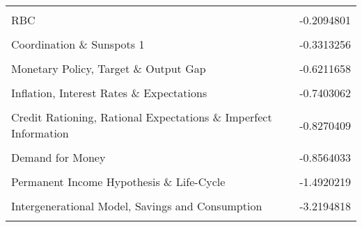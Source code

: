 \documentclass[]{elsarticle} %
\begin{document}
\begin{table}[!h]
\begin{tabular}[t]{lr}
\cellcolor{gray!6}{Endogenous Growth} & \cellcolor{gray!6}{-0.1105033}\\
RBC & -0.2094801\\
\cellcolor{gray!6}{Monetary Policy, Financial Transmission \& Cycles 1} & \cellcolor{gray!6}{-0.2379855}\\
Coordination \& Sunspots 1 & -0.3313256\\
\addlinespace
\cellcolor{gray!6}{Exchange Rate Dynamics \& Expectations} & \cellcolor{gray!6}{-0.4273431}\\
Monetary Policy, Target \& Output Gap & -0.6211658\\
\cellcolor{gray!6}{REH, Monetary Policy \& Business Cycles} & \cellcolor{gray!6}{-0.6758668}\\
Inflation, Interest Rates \& Expectations & -0.7403062\\
\cellcolor{gray!6}{Monetary Approach of Balance of Payments} & \cellcolor{gray!6}{-0.7658536}\\
\addlinespace
Credit Rationing, Rational Expectations \& Imperfect Information & -0.8270409\\
\cellcolor{gray!6}{Inflation \& Rigidities} & \cellcolor{gray!6}{-0.8396888}\\
Demand for Money & -0.8564033\\
\cellcolor{gray!6}{New Theory of Money: Search, Bargaining...} & \cellcolor{gray!6}{-1.2139877}\\
Permanent Income Hypothesis \& Life-Cycle & -1.4920219\\
\addlinespace
\cellcolor{gray!6}{Monetary Economics \& Demand for Money} & \cellcolor{gray!6}{-1.6768415}\\
Intergenerational Model, Savings and Consumption & -3.2194818\\
\cellcolor{gray!6}{Marginal Taxation} & \cellcolor{gray!6}{-3.3179236}\\
\bottomrule
\end{tabular}
\end{table}

\newpage

\begingroup\fontsize{9}{11}\selectfont
\end{document}

